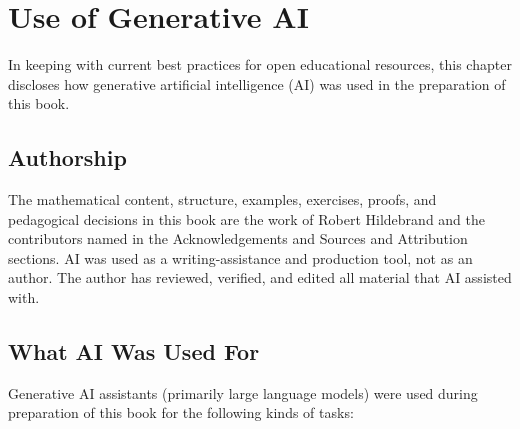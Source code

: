 \chapter*{Use of Generative AI}

In keeping with current best practices for open educational resources,
this chapter discloses how generative artificial intelligence (AI) was
used in the preparation of this book.

\section*{Authorship}

The mathematical content, structure, examples, exercises, proofs, and
pedagogical decisions in this book are the work of Robert Hildebrand
and the contributors named in the Acknowledgements and Sources and
Attribution sections. AI was used as a writing-assistance and
production tool, not as an author. The author has reviewed, verified,
and edited all material that AI assisted with.

\section*{What AI Was Used For}

Generative AI assistants (primarily large language models) were used
during preparation of this book for the following kinds of tasks:


